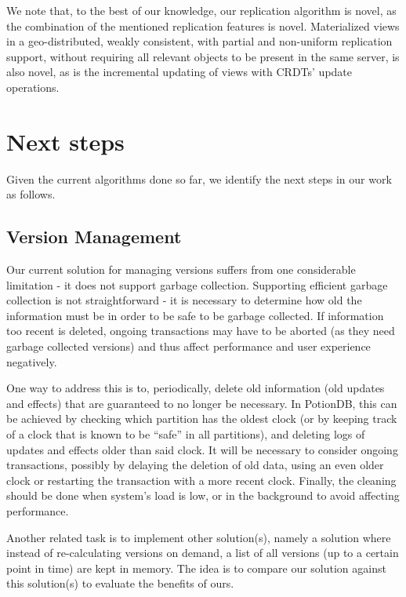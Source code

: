 

We note that, to the best of our knowledge, our replication algorithm is novel, as the combination of the mentioned replication features is novel.
Materialized views in a geo-distributed, weakly consistent, with partial and non-uniform replication support, without requiring all relevant objects to be present in the same server, is also novel, as is the incremental updating of views with CRDTs' update operations.

\section{Next steps}
\label{sec:next_steps}

Given the current algorithms done so far, we identify the next steps in our work as follows.

\subsection{Version Management}

Our current solution for managing versions suffers from one considerable limitation - it does not support garbage collection.
Supporting efficient garbage collection is not straightforward - it is necessary to determine how old the information must be in order to be safe to be garbage collected.
If information too recent is deleted, ongoing transactions may have to be aborted (as they need garbage collected versions) and thus affect performance and user experience negatively.

One way to address this is to, periodically, delete old information (old updates and effects) that are guaranteed to no longer be necessary.
In PotionDB, this can be achieved by checking which partition has the oldest clock (or by keeping track of a clock that is known to be ``safe'' in all partitions), and deleting logs of updates and effects older than said clock.
It will be necessary to consider ongoing transactions, possibly by delaying the deletion of old data, using an even older clock or restarting the transaction with a more recent clock.
Finally, the cleaning should be done when system's load is low, or in the background to avoid affecting performance.

Another related task is to implement other solution(s), namely a solution where instead of re-calculating versions on demand, a list of all versions (up to a certain point in time) are kept in memory.
The idea is to compare our solution against this solution(s) to evaluate the benefits of ours.

